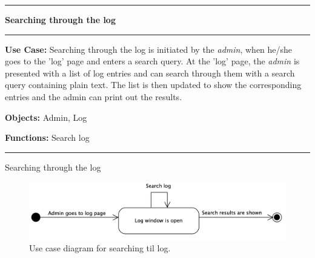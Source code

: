 \begin{use_case}[H]
    \hrule
    \vskip 0.3cm
    \Large
    \begin{center}
    
        \textbf{Searching through the log}
        
    \end{center}
    \vskip 0.1cm
    \hrule
    \vskip 0.2cm
    \normalsize
    
    \textbf{Use Case:} Searching through the log is initiated by the \textit{admin}, when he/she goes to the 'log' page and enters a search query. At the 'log' page, the \textit{admin} is presented with a list of log entries and can search through them with a search query containing plain text. The list is then updated to show the corresponding entries and the admin can print out the results.
    
    \vskip 0.2cm
    
    \textbf{Objects:} Admin, Log
    
    \vskip 0.2cm
    
    \textbf{Functions:} Search log
    
    \vskip 0.4cm
    \hrule
    \vskip 0.2cm
    \caption{Searching through the log} \label{use_case:searching_through_the_log}
\end{use_case}

\begin{figure}[H]
    \centering
    \includegraphics[width=1.0\textwidth]{figures/SearchLog.png}
    \caption{Use case diagram for searching til log.}
    \label{fig:UseCaseSearchLog}
\end{figure}


